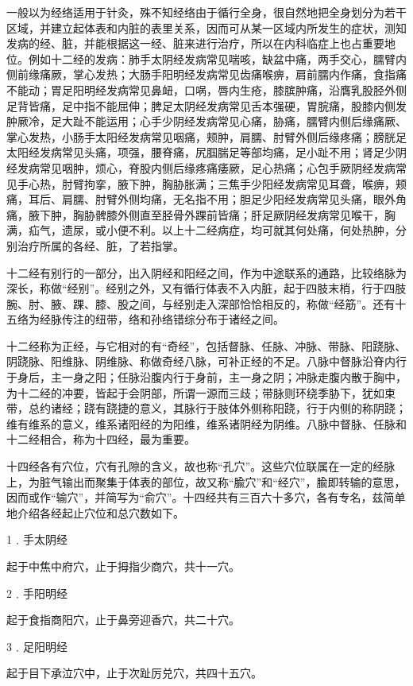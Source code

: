 \documentclass[12pt,UTF8]{ctexbook}
\begin{document}
一般以为经络适用于针灸，殊不知经络由于循行全身，很自然地把全身划分为若干区域，并建立起体表和内脏的表里关系，因而可从某一区域内所发生的症状，测知发病的经、脏，并能根据这一经、脏来进行治疗，所以在内科临症上也占重要地位。例如十二经的发病：肺手太阴经发病常见喘咳，缺盆中痛，两手交心，臑臂内侧前缘痛厥，掌心发热；大肠手阳明经发病常见齿痛喉痹，肩前臑内作痛，食指痛不能动；胃足阳明经发病常见鼻衄，口㖞，唇内生疮，膝膑肿痛，沿膺乳股胫外侧足背皆痛，足中指不能屈伸；脾足太阴经发病常见舌本强硬，胃脘痛，股膝内侧发肿厥冷，足大趾不能运用；心手少阴经发病常见心痛，胁痛，臑臂内侧后缘痛厥、掌心发热，小肠手太阳经发病常见咽痛，颊肿，肩臑、肘臂外侧后缘疼痛；膀胱足太阳经发病常见头痛，项强，腰脊痛，尻腘腨足等部均痛，足小趾不用；肾足少阴经发病常见咽肿，烦心，脊股内侧后缘疼痛痿厥，足心热痛；心包手厥阴经发病常见手心热，肘臂拘挛，腋下肿，胸胁胀满；三焦手少阳经发病常见耳聋，喉痹，颊痛，耳后、肩臑、肘臂外侧均痛，无名指不用；胆足少阳经发病常见头痛，眼外角痛，腋下肿，胸胁髀膝外侧直至胫骨外踝前皆痛；肝足厥阴经发病常见喉干，胸满，疝气，遗尿，或小便不利。以上十二经病症，均可就其何处痛，何处热肿，分别治疗所属的各经、脏，了若指掌。

十二经有别行的一部分，出入阴经和阳经之间，作为中途联系的通路，比较络脉为深长，称做“经别”。经别之外，又有循行体表不入内脏，起于四肢末梢，行于四肢腕、肘、腋、踝、膝、股之间，与经别走入深部恰恰相反的，称做“经筋”。还有十五络为经脉传注的纽带，络和孙络错综分布于诸经之间。

十二经称为正经，与它相对的有“奇经”，包括督脉、任脉、冲脉、带脉、阳跷脉、阴跷脉、阳维脉、阴维脉、称做奇经八脉，可补正经的不足。八脉中督脉沿脊内行于身后，主一身之阳；任脉沿腹内行于身前，主一身之阴；冲脉走腹内散于胸中，为十二经的冲要，皆起于会阴部，所谓一源而三歧；带脉则环绕季胁下，犹如束带，总约诸经；跷有跷捷的意义，其脉行于肢体外侧称阳跷，行于内侧的称阴跷；维有维系的意义，维系诸阳经的为阳维，维系诸阴经为阴维。八脉中督脉、任脉和十二经相合，称为十四经，最为重要。

十四经各有穴位，穴有孔隙的含义，故也称“孔穴”。这些穴位联属在一定的经脉上，为脏气输出而聚集于体表的部位，故又称“腧穴”和“经穴”，腧即转输的意思，因而或作“输穴”，并简写为“俞穴”。十四经共有三百六十多穴，各有专名，兹简单地介绍各经起止穴位和总穴数如下。

1﹒手太阴经

起于中焦中府穴，止于拇指少商穴，共十一穴。

2﹒手阳明经

起于食指商阳穴，止于鼻旁迎香穴，共二十穴。

3﹒足阳明经

起于目下承泣穴中，止于次趾厉兑穴，共四十五穴。
\end{document}
